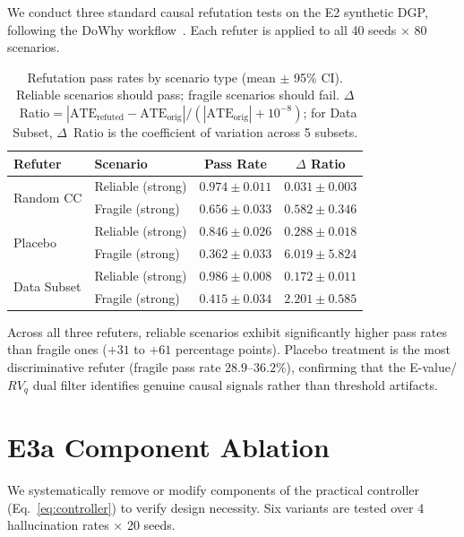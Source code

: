 \documentclass{article}
\begin{document}
We conduct three standard causal refutation tests on the E2 synthetic
DGP, following the DoWhy workflow~\cite{dowhy2020}. Each refuter is
applied to all 40 seeds $\times$ 80 scenarios.

\begin{table}[h]
\centering
\caption{Refutation pass rates by scenario type (mean $\pm$ 95\% CI).
  Reliable scenarios should pass; fragile scenarios should fail.
  $\Delta$~Ratio${}= |\text{ATE}_{\text{refuted}} - \text{ATE}_{\text{orig}}| / (|\text{ATE}_{\text{orig}}| + 10^{-8})$;
  for Data Subset, $\Delta$~Ratio is the coefficient of variation across 5 subsets.}
\label{tab:refutation}
\small
\begin{tabular}{@{}llcc@{}}
\toprule
\textbf{Refuter} & \textbf{Scenario} & \textbf{Pass Rate} & \textbf{$\Delta$ Ratio} \\
\midrule
\multirow{2}{*}{Random CC}
  & Reliable (strong) & $0.974 \pm 0.011$ & $0.031 \pm 0.003$ \\
  & Fragile (strong)  & $0.656 \pm 0.033$ & $0.582 \pm 0.346$ \\
\midrule
\multirow{2}{*}{Placebo}
  & Reliable (strong) & $0.846 \pm 0.026$ & $0.288 \pm 0.018$ \\
  & Fragile (strong)  & $0.362 \pm 0.033$ & $6.019 \pm 5.824$ \\
\midrule
\multirow{2}{*}{Data Subset}
  & Reliable (strong) & $0.986 \pm 0.008$ & $0.172 \pm 0.011$ \\
  & Fragile (strong)  & $0.415 \pm 0.034$ & $2.201 \pm 0.585$ \\
\bottomrule
\end{tabular}
\end{table}

Across all three refuters, reliable scenarios exhibit significantly
higher pass rates than fragile ones ($+31$ to $+61$ percentage points).
Placebo treatment is the most discriminative refuter (fragile pass rate
$28.9$--$36.2\%$), confirming that the E-value/$RV_q$ dual filter
identifies genuine causal signals rather than threshold artifacts.


\section{E3a Component Ablation}
\label{sec:ablation-app}\label{sec:e3a}
\label{tab:e3a}

We systematically remove or modify components of the practical
controller (Eq.~\ref{eq:controller}) to verify design necessity.
Six variants are tested over 4 hallucination rates $\times$ 20 seeds.
\end{document}
